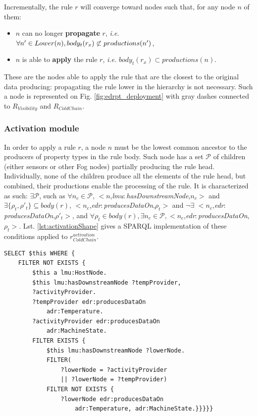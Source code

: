 \documentclass{iosart2c}
\newcommand{\namespace}[1]{\textit{#1$:$}}
\newcommand{\concept}[2]{\namespace{#1}\-\textit{#2}}
\newcommand{\triplet}[3]{$<$#1,\textit{#2},#3$>$}
\begin{document}
Incrementally, the rule $r$ will converge toward nodes such that, for any node $n$ of them:
\begin{itemize}
	\item $n$ can no longer \textbf{propagate} $r$, \textit{i.e.} $\forall n'\in Lo\-wer(n), body_t(r_{x})\not\subset pro\-du\-ctions(n')$,
	\item $n$ is able to \textbf{apply} the rule $r$, \textit{i.e.} $body_t(r_{x})\subset productions(n)$.
\end{itemize} 
These are the nodes able to apply the rule that are the closest to the original data producing: propagating the rule lower in the hierarchy is not necessary.
Such a node is represented on Fig. \ref{fig:edrpt_deployment} with gray dashes connected to $R_{Visibility}$ and $R_{ColdChain}$. 

\subsubsection{Activation module}

In order to apply a rule $r$, a node $n$ must be the lowest common ancestor to the producers of property types in the rule body. 
Such node has a set $\mathcal{P}$ of children (either sensors or other Fog nodes) partially producing the rule head. 
Individually, none of the children produce all the elements of the rule head, but combined, their productions enable the processing of the rule. 
It is characterized as such: $\exists \mathcal{P}$, such as $\forall n_c\in \mathcal{P}$, \triplet{$n$}{\concept{lmu}{has\-Down\-stream\-Node}}{$n_c$} and $\exists \{\rho_t, \rho'_t\} \subseteq body(r)$, \triplet{$n_c$}{\concept{edr}{produces\-Data\-On}}{$\rho_t$} and $\neg\exists$ \triplet{$n_c$}{\concept{edr}{produces\-Data\-On}}{$\rho'_t$}, and $\forall \rho_t \in body(r), \exists n_c\in \mathcal{P},$\triplet{$n_c$}{\concept{edr}{produces\-Data\-On}}{$\rho_t$}.
Lst. \ref{lst:activationShape} gives a SPARQL implementation of these conditions applied to $r_{ColdChain}^{activation}$. 

\begin{lstlisting}[float, caption=$r_{ColdChain}^{activation}$ shape, label=lst:activationShape]
SELECT $this WHERE {
	FILTER NOT EXISTS {
		$this a lmu:HostNode.
		$this lmu:hasDownstreamNode ?tempProvider,
		?activityProvider.
		?tempProvider edr:producesDataOn 
			adr:Temperature.
		?activityProvider edr:producesDataOn 
			adr:MachineState.
		FILTER EXISTS {
			$this lmu:hasDownstreamNode ?lowerNode.
			FILTER(
				?lowerNode = ?activityProvider 
				|| ?lowerNode = ?tempProvider)
			FILTER NOT EXISTS {
				?lowerNode edr:producesDataOn 
					adr:Temperature, adr:MachineState.}}}}}
\end{lstlisting}
\end{document}
